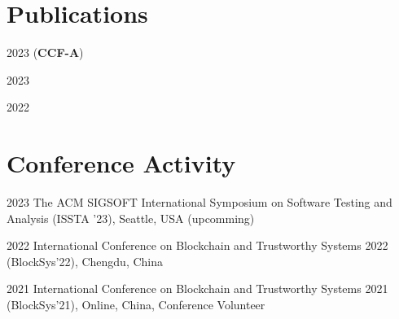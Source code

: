 \documentclass[12pt,letterpaper]{report}
\begin{document}
    \section*{Publications}
    \begin{tablist}
        \item[2023] \tab{} (\textbf{CCF-A})
        \item[2023] \tab{}
        \item[2022] \tab{}
    \end{tablist}


    \section*{Conference Activity}
    \begin{tablist}
        \item[2023] \tab{}The ACM SIGSOFT International Symposium on Software Testing and Analysis (ISSTA '23), Seattle, USA (upcomming)
        \item[2022] \tab{}International Conference on Blockchain and Trustworthy Systems 2022 (BlockSys'22), Chengdu, China
        \item[2021] \tab{}International Conference on Blockchain and Trustworthy Systems 2021 (BlockSys'21), Online, China, Conference Volunteer
    \end{tablist}
\end{document}
